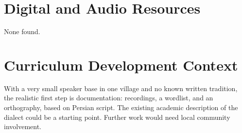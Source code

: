 \documentclass[12pt]{article}
\begin{document}
\section{Digital and Audio Resources}
None found.

\section{Curriculum Development Context}
With a very small speaker base in one village and no known written tradition, the realistic first step is documentation: recordings, a wordlist, and an orthography, based on Persian script. The existing academic description of the dialect could be a starting point. Further work would need local community involvement.
\end{document}
